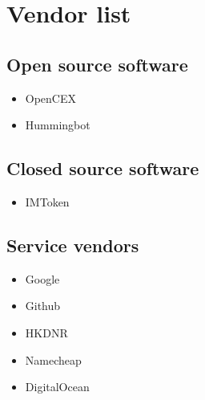 \chapter{Vendor list}

\section{Open source software}
\begin{itemize}
\item OpenCEX
\item Hummingbot
\end{itemize}

\section{Closed source software}
\begin{itemize}
  \item IMToken
\end{itemize}
\section{Service vendors}
\begin{itemize}
\item Google
\item Github
\item HKDNR
\item Namecheap
  \item DigitalOcean
\end{itemize}

